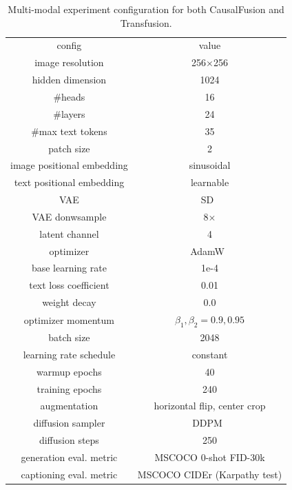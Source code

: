 \begin{table}[h]
    \footnotesize
    \begin{tabular}{c|c}
        config & value \\
        \shline
        image resolution & 256$\times$256 \\
        hidden dimension & 1024 \\
        \#heads & 16 \\
        \#layers & 24 \\
        \#max text tokens & 35 \\
        patch size & 2 \\
        image positional embedding & sinusoidal \\
        text positional embedding & learnable \\
        VAE & SD~\cite{SD-vae} \\
        VAE donwsample& 8$\times$ \\
        latent channel & 4 \\
        \hline
        optimizer & AdamW~\cite{loshchilov2017decoupled} \\
        base learning rate & 1e-4 \\
        text loss coefficient & 0.01 \\
        weight decay & 0.0 \\
        optimizer momentum & $\beta_1, \beta_2{=}0.9, 0.95$ \\
        batch size & 2048 \\
        learning rate schedule & constant \\
        warmup epochs & 40 \\
        training epochs & 240 \\
        augmentation & horizontal flip, center crop \\
        \hline
        diffusion sampler & DDPM~\cite{ddpm} \\
        diffusion steps & 250 \\
        generation eval. metric & MSCOCO 0-shot FID-30k \\
        captioning eval. metric & MSCOCO CIDEr (Karpathy test) \\
    \end{tabular}
    \caption{Multi-modal experiment configuration for both CausalFusion and Transfusion.}
    \label{tab:t2i2t_abla} 
\end{table}
 \vspace{-10pt}


